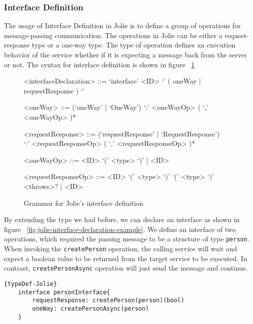 \subsubsection{Interface Definition}
\label{sec:jolie-interface-def}

The usage of Interface Definition in Jolie is to define a group of operations for message-passing communication. The operations in Jolie can be either a request-response type or a one-way type. The type of operation defines an execution behavior of the service whether if it is expecting a message back from the server or not. The syntax for interface definition is shown in figure ~\ref{fig:InterfaceDefinitonSyntax}

\begin{figure}[h]
	\begin{framed}
		\begin{grammar}
			<interfaceDeclaration> ::= `interface' <ID> `{' ( oneWay | requestResponse ) `}'

			<oneWay> ::= (`oneWay' | `OneWay')  `:' <oneWayOp> ( `,' <oneWayOp> )*

			<requestResponse> ::= (`requestResponse' | `RequestResponse') \\ `:' <requestResponseOp> ( `,' <requestResponseOp> )*

			<oneWayOp> ::= <ID> `(' <type> `)' | <ID>

			<requestResponseOp> ::= <ID> `(' <type> `)' `(' <type> `)' <throws>? | <ID>

		\end{grammar}
	\end{framed}
	\caption{Grammar for Jolie's interface definition\protect\footnotemark}
	\label{fig:InterfaceDefinitonSyntax}
\end{figure}


By extending the type we had before, we can declare an interface as shown in figure ~\ref{fig:jolie-interface-declaration-example}. We define an interface of two operations, which required the passing message to be a structure of type \texttt{person}. When invoking the \texttt{createPerson} operation, the calling service will wait and expect a boolean value to be returned from the target service to be executed. In contrast, \texttt{createPersonAsync} operation will just send the message and continue.

\begin{listing}[h]

	\lstset{language=Jolie,
		style=codeStyle
	}
	\begin{lstlisting}[frame=tlrb ]{typeDef-Jolie}
	interface personInterface{
		requestResponse: createPerson(person)(bool)
		oneWay: createPersonAsync(person)
	}
	\end{lstlisting}
    \caption{Jolie implementation of interface declaration}
    \label{fig:jolie-interface-declaration-example}
\end{listing}
\FloatBarrier
